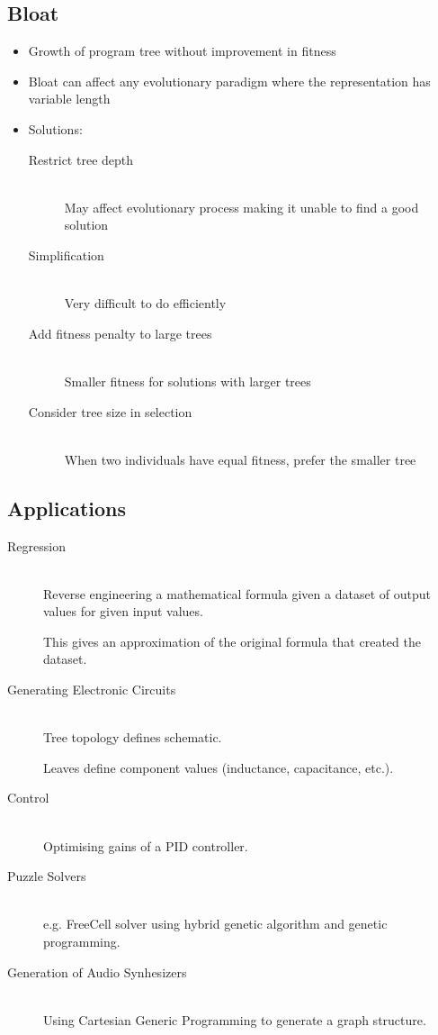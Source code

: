 \documentclass[a4paper]{article}
\begin{document}
\subsection{Bloat}

\begin{itemize}
  \item Growth of program tree without improvement in fitness
  \item Bloat can affect any evolutionary paradigm where the representation
        has variable length
  \item Solutions:
    \begin{description}
      \item[Restrict tree depth] \hfill \\
        May affect evolutionary process making it unable to find a good
        solution
      \item[Simplification] \hfill \\
        Very difficult to do efficiently
      \item[Add fitness penalty to large trees] \hfill \\
        Smaller fitness for solutions with larger trees
      \item[Consider tree size in selection] \hfill \\
        When two individuals have equal fitness, prefer the smaller tree
    \end{description}
\end{itemize}

\subsection{Applications}

\begin{description}
  \item[Regression] \hfill \\
    Reverse engineering a mathematical formula given a dataset of output values
    for given input values.

    This gives an approximation of the original formula that created the
    dataset.

  \item[Generating Electronic Circuits] \hfill \\
    Tree topology defines schematic.

    Leaves define component values (inductance, capacitance, etc.).

  \item[Control] \hfill \\
    Optimising gains of a PID controller.

  \item[Puzzle Solvers] \hfill \\
    e.g. FreeCell solver using hybrid genetic algorithm and genetic
    programming.

  \item[Generation of Audio Synhesizers] \hfill \\
    Using Cartesian Generic Programming to generate a graph structure.

\end{description}
\end{document}
